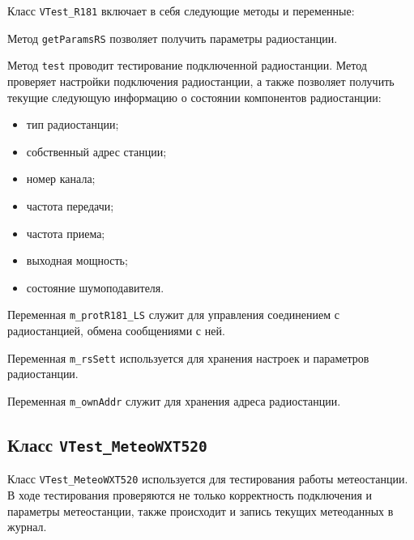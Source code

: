 Класс \texttt{VTest\_R181} включает в себя следующие методы и переменные:
\begin{enum}
	\item Метод \texttt{getParamsRS} позволяет получить параметры радиостанции.

	\item Метод \texttt{test} проводит тестирование подключенной радиостанции. Метод проверяет настройки подключения
		радиостанции, а также позволяет получить текущие следующую информацию о состоянии компонентов
		радиостанции:
		\begin{itemize}
			\item тип радиостанции;
			\item собственный адрес станции;
			\item номер канала;
			\item частота передачи;
			\item частота приема;
			\item выходная мощность;
			\item состояние шумоподавителя.
		\end{itemize}

	\item Переменная \texttt{m\_protR181\_LS} служит для управления соединением с радиостанцией, обмена сообщениями
		с ней.

	\item Переменная \texttt{m\_rsSett} используется для хранения настроек и параметров радиостанции.

	\item Переменная \texttt{m\_ownAddr} служит для хранения адреса радиостанции.
\end{enum}

\subsection{Класс \texttt{VTest\_MeteoWXT520}}
Класс \texttt{VTest\_MeteoWXT520} используется для тестирования работы метеостанции. В ходе тестирования проверяются не
только корректность подключения и параметры метеостанции, также происходит и запись текущих метеоданных в журнал.

